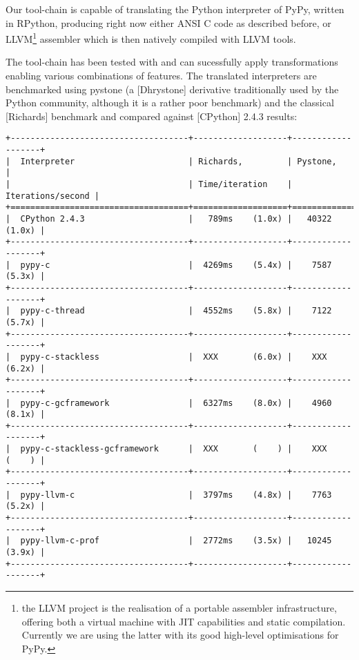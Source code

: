 \documentclass{acm_proc_article-sp}
\begin{document}
Our tool-chain is capable of translating the Python interpreter of
PyPy, written in RPython, producing right now either ANSI C code as
described before, or LLVM\footnote{the LLVM project is the realisation
of a portable assembler infrastructure, offering both a virtual
machine with JIT capabilities and static compilation. Currently we are
using the latter with its good high-level optimisations for PyPy.}
assembler which is then natively compiled with LLVM tools.

The tool-chain has been tested with and can sucessfully apply
transformations enabling various combinations of features. The
translated interpreters are benchmarked using pystone (a [Dhrystone]
derivative traditionally used by the Python community, although it is a
rather poor benchmark) and the classical [Richards] benchmark and
compared against [CPython] 2.4.3 results:

\begin{verbatim}
+------------------------------------+-------------------+-------------------+
|  Interpreter                       | Richards,         | Pystone,          |
|                                    | Time/iteration    | Iterations/second |
+====================================+===================+===================+
|  CPython 2.4.3                     |   789ms    (1.0x) |   40322    (1.0x) |
+------------------------------------+-------------------+-------------------+
|  pypy-c                            |  4269ms    (5.4x) |    7587    (5.3x) |
+------------------------------------+-------------------+-------------------+
|  pypy-c-thread                     |  4552ms    (5.8x) |    7122    (5.7x) |
+------------------------------------+-------------------+-------------------+
|  pypy-c-stackless                  |  XXX       (6.0x) |    XXX     (6.2x) |
+------------------------------------+-------------------+-------------------+
|  pypy-c-gcframework                |  6327ms    (8.0x) |    4960    (8.1x) |
+------------------------------------+-------------------+-------------------+
|  pypy-c-stackless-gcframework      |  XXX       (    ) |    XXX     (    ) |
+------------------------------------+-------------------+-------------------+
|  pypy-llvm-c                       |  3797ms    (4.8x) |    7763    (5.2x) |
+------------------------------------+-------------------+-------------------+
|  pypy-llvm-c-prof                  |  2772ms    (3.5x) |   10245    (3.9x) |
+------------------------------------+-------------------+-------------------+
\end{verbatim}
\end{document}
